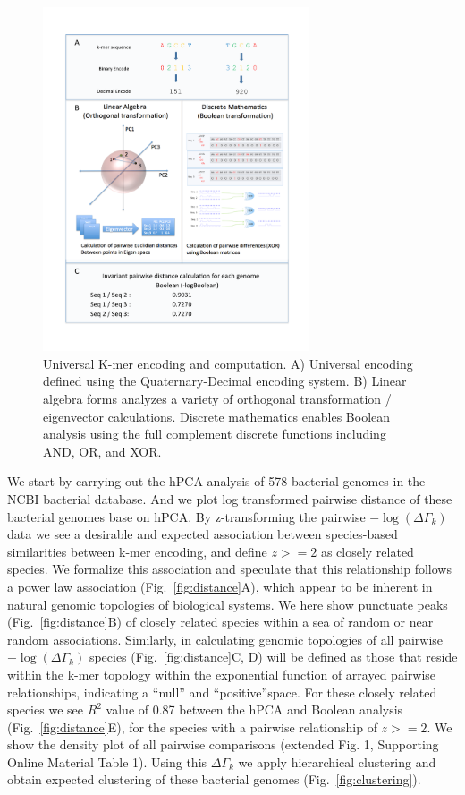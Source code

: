 \documentclass[12pt]{article}
\begin{document}
\begin{figure}
%
\begin{center}
%
\includegraphics[width=0.7\textwidth]{Universal_K-mer_encoding_and_computation.pdf}
%
\caption{\label{fig:encoding}Universal K-mer encoding and computation.  A) Universal encoding defined using the Quaternary-Decimal encoding system. B) Linear algebra forms analyzes a variety of orthogonal transformation / eigenvector calculations. Discrete mathematics enables Boolean analysis using the full complement discrete functions including AND, OR, and XOR.}
%
\end{center}
\end{figure}

We start by carrying out the hPCA analysis of 578 bacterial genomes in the NCBI bacterial database.  And we plot log transformed pairwise distance of these bacterial genomes base on hPCA. By z-transforming the pairwise $ - \log (\Delta {\Gamma _k})$ data we see a desirable and expected association between species-based similarities between k-mer encoding, and define $z >  = 2$ as closely related species. We formalize this association and speculate that this relationship follows a power law association (Fig.~\ref{fig:distance}A), which appear to be inherent in natural genomic topologies of biological systems. We here show punctuate peaks (Fig.~\ref{fig:distance}B) of closely related species within a sea of random or near random associations. Similarly, in calculating genomic topologies of all pairwise $ - \log (\Delta {\Gamma _k})$ species (Fig.~\ref{fig:distance}C, D) will be defined as those that reside within the k-mer topology within the exponential function of arrayed pairwise relationships, indicating a ``null'' and ``positive''space. For these closely related species we see ${R^2}$ value of 0.87 between the hPCA and Boolean analysis (Fig.~\ref{fig:distance}E), for the species with a pairwise relationship of $z>=2$. We show the density plot of all pairwise comparisons (extended Fig. 1, Supporting Online Material Table 1). Using this $\Delta {\Gamma _k}$ we apply hierarchical clustering and obtain expected clustering of these bacterial genomes (Fig.~\ref{fig:clustering}). 
\end{document}
